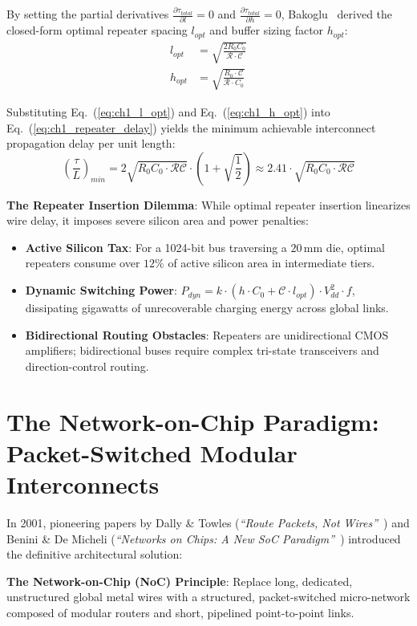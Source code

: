 By setting the partial derivatives $\frac{\partial \tau_{total}}{\partial l} = 0$ and $\frac{\partial \tau_{total}}{\partial h} = 0$, Bakoglu~\cite{Bakoglu1990} derived the closed-form optimal repeater spacing $l_{opt}$ and buffer sizing factor $h_{opt}$:
\begin{align}
l_{opt} &= \sqrt{\frac{2 R_0 C_0}{\mathcal{R} \cdot \mathcal{C}}} \label{eq:ch1_l_opt} \\
h_{opt} &= \sqrt{\frac{R_0 \cdot \mathcal{C}}{\mathcal{R} \cdot C_0}} \label{eq:ch1_h_opt}
\end{align}

Substituting Eq.~(\ref{eq:ch1_l_opt}) and Eq.~(\ref{eq:ch1_h_opt}) into Eq.~(\ref{eq:ch1_repeater_delay}) yields the minimum achievable interconnect propagation delay per unit length:
\begin{equation}
\left( \frac{\tau}{L} \right)_{min} = 2 \sqrt{R_0 C_0 \cdot \mathcal{R}\mathcal{C}} \cdot \left( 1 + \sqrt{\frac{1}{2}} \right) \approx 2.41 \cdot \sqrt{R_0 C_0 \cdot \mathcal{R}\mathcal{C}}
\label{eq:ch1_min_delay_per_mm}
\end{equation}

\begin{svgraybox}
\textbf{The Repeater Insertion Dilemma}: While optimal repeater insertion linearizes wire delay, it imposes severe silicon area and power penalties:
\begin{itemize}
    \item \textbf{Active Silicon Tax}: For a 1024-bit bus traversing a $20\,\mathrm{mm}$ die, optimal repeaters consume over $12\%$ of active silicon area in intermediate tiers.
    \item \textbf{Dynamic Switching Power}: $P_{dyn} = k \cdot (h \cdot C_0 + \mathcal{C} \cdot l_{opt}) \cdot V_{dd}^2 \cdot f$, dissipating gigawatts of unrecoverable charging energy across global links.
    \item \textbf{Bidirectional Routing Obstacles}: Repeaters are unidirectional CMOS amplifiers; bidirectional buses require complex tri-state transceivers and direction-control routing.
\end{itemize}
\end{svgraybox}

\section{The Network-on-Chip Paradigm: Packet-Switched Modular Interconnects}
\label{sec:ch1_noc_paradigm}

In 2001, pioneering papers by Dally \& Towles (\emph{``Route Packets, Not Wires''}~\cite{Dally2001}) and Benini \& De Micheli (\emph{``Networks on Chips: A New SoC Paradigm''}~\cite{Benini2002}) introduced the definitive architectural solution:
\begin{svgraybox}
\textbf{The Network-on-Chip (NoC) Principle}: Replace long, dedicated, unstructured global metal wires with a structured, packet-switched micro-network composed of modular routers and short, pipelined point-to-point links.
\end{svgraybox}


